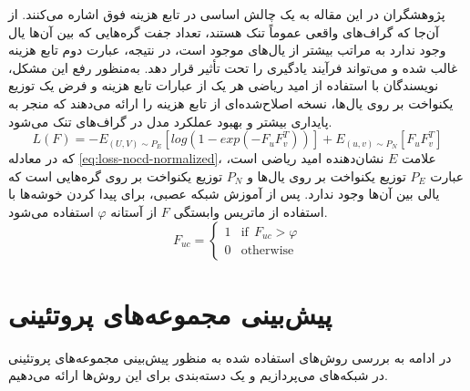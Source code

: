 پژوهشگران در این مقاله به یک چالش اساسی در تابع هزینه فوق اشاره می‌کنند. از آن‌جا که گراف‌های واقعی عموماً تنک هستند، تعداد جفت ‌گره‌هایی که بین آن‌ها یال وجود ندارد به‌ مراتب بیشتر از یال‌های موجود است، در نتیجه، عبارت دوم تابع هزینه غالب شده و می‌تواند فرآیند یادگیری را تحت تأثیر قرار دهد. به‌منظور رفع این مشکل، نویسندگان با استفاده از امید ریاضی هر یک از عبارات تابع هزینه و فرض یک توزیع یکنواخت بر روی یال‌ها، نسخه اصلاح‌شده‌ای از تابع هزینه را ارائه می‌دهند که منجر به پایداری بیشتر و بهبود عملکرد مدل در گراف‌های تنک می‌شود.
\begin{equation}
	L(F)=-E_{(U,V)\sim P_E}[log(1-exp(-F_uF_v^T))]+E_{(u,v)\sim P_N}[F_uF_v^T]
	\label{eq:loss-nocd-normalized}
\end{equation}
که در  معادله \ref{eq:loss-nocd-normalized}، علامت $E$ نشان‌دهنده امید ریاضی است، عبارت $P_E$ توزیع یکنواخت بر روی یال‌ها و $P_N$ توزیع یکنواخت بر روی گره‌هایی است که یالی بین آن‌ها وجود ندارد. پس از آموزش شبکه عصبی، برای پیدا کردن خوشه‌ها با استفاده از ماتریس وابستگی $F$ از آستانه $\varphi$ استفاده می‌شود.
\begin{equation}
	F_{uc} = 
	\begin{cases}
		1 & \text{if} \:\: F_{uc}>\varphi \\
		0 & \text{otherwise} 
	\end{cases}
\end{equation}
\section{پیش‌بینی مجموعه‌های پروتئینی}

در ادامه به بررسی روش‌های استفاده شده به منظور پیش‌بینی مجموعه‌های پروتئینی در شبکه‌های  می‌پردازیم و یک دسته‌بندی برای این روش‌ها ارائه می‌دهیم.

